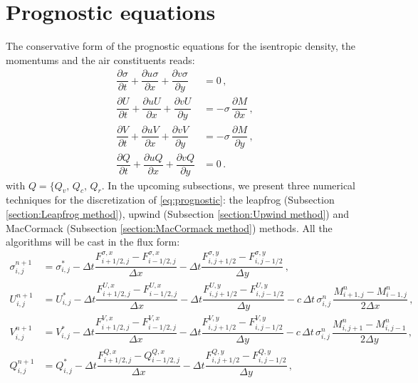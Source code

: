 \documentclass{article}
\numberwithin{equation}{section}
\begin{document}
	\section{Prognostic equations}
		The conservative form of the prognostic equations for the isentropic density, the momentums and the air constituents reads:
		\begin{subequations}
			\label{eq:prognostic}
			\begin{align}
				\dfrac{\partial \sigma}{\partial t} + \dfrac{\partial u \sigma}{\partial x} + \dfrac{\partial v \sigma}{\partial y} & = 0 \, , \\
				\dfrac{\partial U}{\partial t} + \dfrac{\partial u U}{\partial x} + \dfrac{\partial v U}{\partial y} & = -\sigma \, \dfrac{\partial M}{\partial x} \, , \\
				\dfrac{\partial V}{\partial t} + \dfrac{\partial u V}{\partial x} + \dfrac{\partial v V}{\partial y} & = -\sigma \, \dfrac{\partial M}{\partial y} \, , \\
				\dfrac{\partial Q}{\partial t} + \dfrac{\partial u Q}{\partial x} + \dfrac{\partial v Q}{\partial y} & = 0 \, .
			\end{align}
		\end{subequations}
		with $Q = \lbrace Q_v, \, Q_c, \, Q_r $. In the upcoming subsections, we present three numerical techniques for the discretization of \eqref{eq:prognostic}: the leapfrog (Subsection \ref{section:Leapfrog method}), upwind (Subsection \ref{section:Upwind method}) and MacCormack (Subsection \ref{section:MacCormack method}) methods. All the algorithms will be cast in the flux form:
		\begin{subequations}
			\label{eq:flux-form}
			\begin{align}
				\sigma_{i,j}^{n+1} & = \sigma_{i,j}^* - \Delta t \dfrac{F_{i+1/2,j}^{\sigma,x} - F_{i-1/2,j}^{\sigma,x}}{\Delta x} - \Delta t \dfrac{F_{i,j+1/2}^{\sigma,y} - F_{i,j-1/2}^{\sigma,y}}{\Delta y} \, , \\
				U_{i,j}^{n+1} & = U_{i,j}^* - \Delta t \dfrac{F_{i+1/2,j}^{U,x} - F_{i-1/2,j}^{U,x}}{\Delta x} - \Delta t \dfrac{F_{i,j+1/2}^{U,y} - F_{i,j-1/2}^{U,y}}{\Delta y} - c \, \Delta t \, \sigma_{i,j}^n \, \dfrac{M_{i+1,j}^n - M_{i-1,j}^n}{2 \Delta x} \, , \\
				V_{i,j}^{n+1} & = V_{i,j}^* - \Delta t \dfrac{F_{i+1/2,j}^{V,x} - F_{i-1/2,j}^{V,x}}{\Delta x} - \Delta t \dfrac{F_{i,j+1/2}^{V,y} - F_{i,j-1/2}^{V,y}}{\Delta y} - c \, \Delta t \, \sigma_{i,j}^n \, \dfrac{M_{i,j+1}^n - M_{i,j-1}^n}{2 \Delta y} \, , \\
				Q_{i,j}^{n+1} & = Q_{i,j}^* - \Delta t \dfrac{F_{i+1/2,j}^{Q,x} - Q_{i-1/2,j}^{Q,x}}{\Delta x} - \Delta t \dfrac{F_{i,j+1/2}^{Q,y} - F_{i,j-1/2}^{Q,y}}{\Delta y} \, ,
			\end{align}
		\end{subequations}
\end{document}

